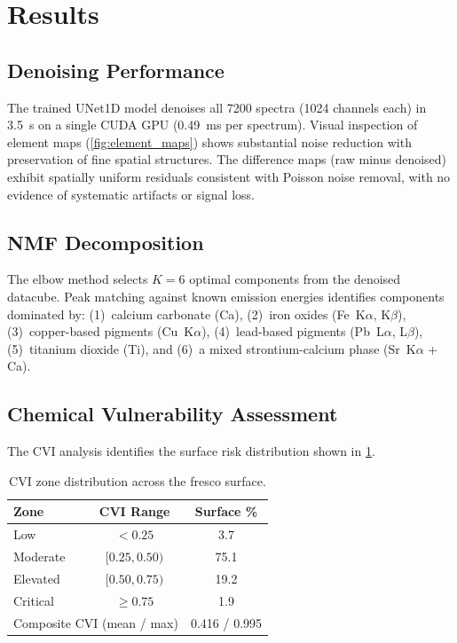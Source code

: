 \documentclass[twocolumn,11pt]{article}
\begin{document}
\section{Results}
\label{sec:results}

\subsection{Denoising Performance}

The trained UNet1D model denoises all \num{7200} spectra (\num{1024} channels
each) in \SI{3.5}{\second} on a single CUDA GPU (\SI{0.49}{\milli\second} per
spectrum). Visual inspection of element maps (\cref{fig:element_maps}) shows
substantial noise reduction with preservation of fine spatial structures.
The difference maps (raw minus denoised) exhibit spatially uniform residuals
consistent with Poisson noise removal, with no evidence of systematic
artifacts or signal loss.

\subsection{NMF Decomposition}

The elbow method selects $K = 6$ optimal components from the denoised
datacube. Peak matching against known emission energies identifies components
dominated by: (1)~calcium carbonate (Ca), (2)~iron oxides (Fe~K$\alpha$,
K$\beta$), (3)~copper-based pigments (Cu~K$\alpha$), (4)~lead-based pigments
(Pb~L$\alpha$, L$\beta$), (5)~titanium dioxide (Ti), and (6)~a mixed
strontium-calcium phase (Sr~K$\alpha$ + Ca).

\subsection{Chemical Vulnerability Assessment}

The CVI analysis identifies the surface risk distribution shown in
\cref{tab:cvi_results}.

\begin{table}[h]
\centering
\caption{CVI zone distribution across the fresco surface.}
\label{tab:cvi_results}
\begin{tabular}{@{}lcc@{}}
\toprule
Zone & CVI Range & Surface \% \\
\midrule
Low        & $< 0.25$           & 3.7 \\
Moderate   & $[0.25, 0.50)$     & 75.1 \\
Elevated   & $[0.50, 0.75)$     & 19.2 \\
Critical   & $\ge 0.75$         & 1.9 \\
\midrule
\multicolumn{2}{l}{Composite CVI (mean / max)} & 0.416 / 0.995 \\
\bottomrule
\end{tabular}
\end{table}
\end{document}

